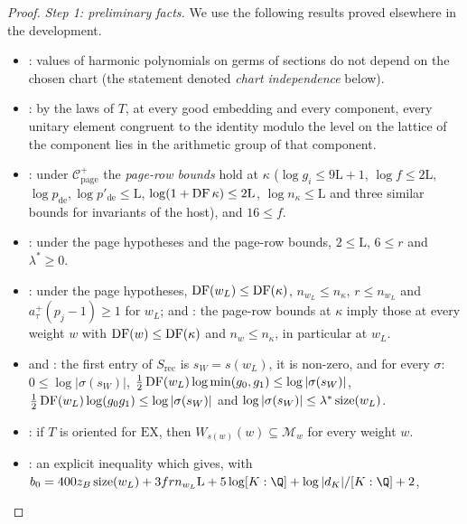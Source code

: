 \begin{proof}
\emph{Step 1: preliminary facts.} We use the following results proved elsewhere in the development.
\begin{itemize}
\item {}: values of harmonic polynomials on germs of
sections do not depend on the chosen chart (the statement denoted \emph{chart independence} below).
\item {}: by the laws of $T$, at every good embedding and every
component, every unitary element congruent to the identity modulo the level on the lattice of the component lies in
the arithmetic group of that component.
\item {}: under $\mathcal C^+_{\mathrm{page}}$ the \emph{page-row bounds} hold at
$\kappa$ ($\log g_i\le9\mathrm L+1$, $\log f\le2\mathrm L$, $\log p_{\mathrm{de}},\log p'_{\mathrm{de}}\le\mathrm L$, $\log(1+\operatorname{DF}
\kappa)\le2\mathrm L$, $\log n_\kappa\le\mathrm L$ and three similar bounds for invariants of the host), and $16\le f$.
\item {}: under the page hypotheses and the page-row bounds,
$2\le\mathrm L$, $6\le r$ and $\lambda^*\ge0$.
\item {}: under the page hypotheses, $\operatorname{DF}(w_L)\le\operatorname{DF}(\kappa)$,
$n_{w_L}\le n_\kappa$, $r\le n_{w_L}$ and $a^+_\tau(p_j-1)\ge1$ for $w_L$; and : the
page-row bounds at $\kappa$ imply those at every weight $w$ with $\operatorname{DF}(w)\le\operatorname{DF}(\kappa)$ and $n_w\le n_\kappa$, in
particular at $w_L$.
\item {} and : the first
entry of $S_{\mathrm{rec}}$ is $s_W=s(w_L)$, it is non-zero, and for every $\sigma$:
$0\le\log|\sigma(s_W)|$, $\frac12\operatorname{DF}(w_L)\log\min(g_0,g_1)\le\log|\sigma(s_W)|$,
$\frac12\operatorname{DF}(w_L)\log(g_0g_1)\le\log|\sigma(s_W)|$ and $\log|\sigma(s_W)|\le\lambda^*\operatorname{size}(w_L)$.
\item {}: if $T$ is oriented for $\mathrm{EX}$, then
$W_{s(w)}(w)\subseteq\mathcal M_w$ for every weight $w$.
\item {}: an explicit inequality which gives, with
$b_0=400z_B\ontoonesize(w_L)+3frn_{w_L}\mathrm L+5\log[K:\Q]+\log|d_K|/[K:\Q]+2$,

\end{itemize}
\end{proof}

